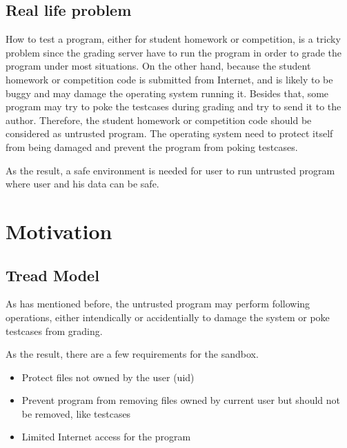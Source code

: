 \documentclass[conference,compsoc]{IEEEtran}
\begin{document}
	\subsection{Real life problem}
		\par
			How to test a program, either for student homework or competition, is a tricky problem since the grading server have to run the program in order to grade the program under most situations. 
			On the other hand, because the student homework or competition code is submitted from Internet, and is likely to be buggy and may damage the operating system running it. 
			Besides that, some program may try to poke the testcases during grading and try to send it to the author.
			Therefore, the student homework or competition code should be considered as untrusted program. 
			The operating system need to protect itself from being damaged and prevent the program from poking testcases.
		\par
			As the result, a safe environment is needed for user to run untrusted program where user and his data can be safe. 
\section {Motivation}
	\subsection{Tread Model}
		\par
			As has mentioned before, the untrusted program may perform following operations, either intendically or accidentially to damage the system or poke testcases from grading.
		\par
			As the result, there are a few requirements for the sandbox.
			\begin{itemize}
				\item {Protect files not owned by the user (uid)}
				\item {Prevent program from removing files owned by current user but should not be removed, like testcases}
				\item {Limited Internet access for the program}
			\end{itemize}
\end{document}
